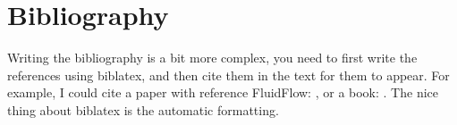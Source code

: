 \documentclass{article}
\begin{document}
\section{Bibliography}

Writing the bibliography is a bit more complex, you need to first write the references using biblatex, and then cite them in the text for them to appear. For example, I could cite a paper with reference FluidFlow: \cite{FluidFlow}, or a book: \cite{KeelerNMR}. The nice thing about biblatex is the automatic formatting.

\printbibliography
\end{document}
